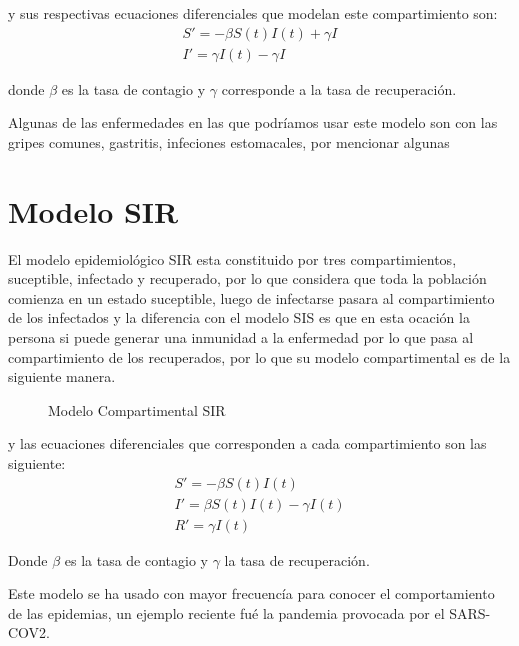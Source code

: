 \documentclass[a4paper,openright,12pt]{book}
\begin{document}
y sus respectivas ecuaciones diferenciales que modelan este compartimiento son: 
\begin{align} 
S' =  -\beta S\left(t\right)I\left(t\right) + \gamma I \\
I'   = \gamma I\left(t\right) - \gamma I
\end{align}

donde $\beta$ es la tasa de contagio y $\gamma$ corresponde a la tasa de recuperación.

Algunas de las enfermedades en las que podríamos usar este modelo son con las gripes comunes, gastritis, infeciones estomacales, por mencionar algunas

\section{Modelo SIR}

El modelo epidemiológico SIR  esta constituido por tres compartimientos, suceptible, infectado y recuperado, por lo que considera que toda la población comienza en un estado suceptible, luego de infectarse pasara al compartimiento de los infectados y la diferencia con el modelo SIS es que en esta ocación la persona si puede generar una inmunidad a la enfermedad por lo que pasa al compartimiento de los recuperados, por lo que su modelo compartimental es de la siguiente manera.\\

\begin{figure}[h]
\centering
{}
\caption{Modelo Compartimental SIR} \label{fig:Compartimento SIR}
\end{figure}	

y las ecuaciones diferenciales que corresponden a cada compartimiento son las siguiente: 
\begin{align}
S' = -\beta S\left(t\right)I\left(t\right)\\			
I' = \beta S\left(t\right)I\left(t\right) - \gamma I\left(t\right)\\		
R' = \gamma I\left(t\right)
\end{align}

Donde $\beta$ es la tasa de contagio y $\gamma$ la tasa de recuperación.

Este modelo se ha usado con mayor frecuencía para conocer el comportamiento de las epidemias, un ejemplo reciente fué la pandemia provocada por el SARS-COV2.
\end{document}
